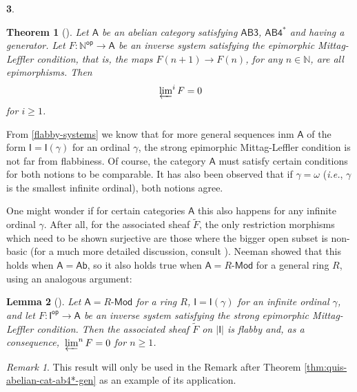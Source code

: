 \documentclass[reqno,11pt]{amsart}
\theoremstyle{plain}
\newtheorem{thm}{Theorem}[section]
\newtheorem{lem}[thm]{Lemma}
\theoremstyle{remark}
\newtheorem*{rem}{Remark}
\theoremstyle{definition}
\newtheorem{cosa}[thm]{}
\numberwithin{equation}{thm}
\newcommand{\SA}{\mathsf{A}}
\newcommand{\SI}{\mathsf{I}}
\newcommand{\NN}{\mathbb{N}}
\newcommand{\md}{\text{-}\mathsf{Mod}}
\newcommand{\op}{\mathsf{op}}
\newcommand{\ab}{\mathsf{Ab}}
\begin{document}
\begin{cosa}
		\begin{thm}[{\cite[Theorem 3.1.]{roos-2006}}]\label{thm:vanishing-countable-mittag-leffler-higher-limits}
		Let $\SA$ be an abelian category satisfying $\mathsf{AB3}$, $\mathsf{AB4^*}$ and \emph{having a generator}. Let $F \colon \NN^\op \to \SA$ be an inverse system satisfying the epimorphic Mittag-Leffler condition, that is, the maps $F(n+1) \to F(n)$, for any $n \in \NN$, are all epimorphisms. Then
		\[
			\sideset{}{^{i}}\varprojlim F = 0
		\]
		for $i \geq 1$.	
		\end{thm}
		
		From \ref{flabby-systems} we know that for more general sequences inm $\SA$ of the form $\SI = \SI(\gamma)$ for an ordinal $\gamma$, the strong epimorphic Mittag-Leffler condition is not far from flabbiness. Of course, the category $\SA$ must satisfy certain conditions for both notions to be comparable. It has also been observed that if $\gamma = \omega$ (\textit{i.e.}, $\gamma$ is the smallest infinite ordinal), both notions agree.
		
		One might wonder if for certain categories $\SA$ this also happens for any infinite ordinal $\gamma$. After all, for the associated sheaf $\tilde{F}$, the only restriction morphisms which need to be shown surjective are those where the bigger open subset is non-basic (for a much more detailed discussion, consult \cite[Remark A.3.12.]{Ntc}). Neeman showed that this holds when $\SA = \ab$, so it also holds true when $\SA = R\md$ for a general ring $R$, using an analogous argument:
		
		\begin{lem}[{\cite[Lemma A.3.13 and Corollary A.3.14]{Ntc}}]\label{lem: sequences-flabby-neeman}
			Let $\SA = R\md$ for a ring $R$, $\SI = \SI(\gamma)$ for an infinite ordinal $\gamma$, and let $F \colon \SI^\op \to \SA$ be an inverse system satisfying the strong epimorphic Mittag-Leffler condition. Then the associated sheaf $\tilde{F}$ on $|\SI|$ is flabby and, as a consequence, $\sideset{}{^{n}}\varprojlim F = 0$ for $n \geq 1$.
		\end{lem}
		
		\begin{rem}
			This result will only be used in the Remark after Theorem \ref{thm:quis-abelian-cat-ab4*-gen} as an example of its application.
		\end{rem}
		
	\end{cosa}
	
	
\end{document}
